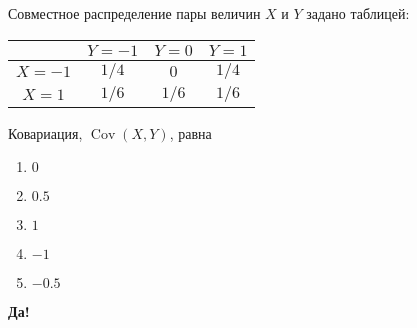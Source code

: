 \documentclass[t]{beamer}
\DeclareMathOperator{\Cov}{Cov}
\begin{document}
 \begin{frame} \label{16-Yes} 
\begin{block}{16} 

Совместное распределение пары величин $X$ и $Y$ задано таблицей:

\begin{center}
	\begin{tabular}{@{}c|ccc@{}}
		\toprule
		& $Y=-1$ & $Y=0$ & $Y=1$ \\ \midrule
		$X=-1$ & $1/4$  & $0$   & $1/4$ \\
		$X=1$  & $1/6$  & $1/6$ & $1/6$ \\ \bottomrule
	\end{tabular}
\end{center}

\vspace{0.5cm} 
 
 
Ковариация, $\Cov(X,Y)$, равна
 


 \end{block} 
\begin{enumerate} 
\item[] \hyperlink{16-Yes}{\beamergotobutton{} $0$}
\item[] \hyperlink{16-No}{\beamergotobutton{} $0.5$}
\item[] \hyperlink{16-No}{\beamergotobutton{} $1$}
\item[] \hyperlink{16-No}{\beamergotobutton{} $-1$
}
\item[] \hyperlink{16-No}{\beamergotobutton{} $-0.5$}
\end{enumerate} 

 \textbf{Да!} 
 \hyperlink{17}{}\end{frame} 
\end{document}
